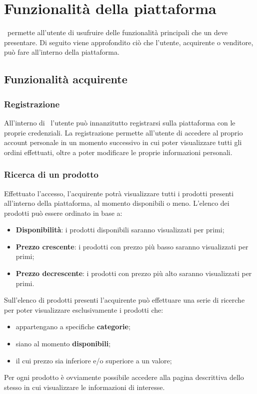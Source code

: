 \section{Funzionalità della piattaforma}
\NomeProgetto\ permette all'utente di usufruire delle funzionalità principali che un  deve presentare. Di seguito viene approfondito ciò che l'utente, acquirente o venditore, può fare all'interno della piattaforma.
\subsection{Funzionalità acquirente}\label{FunzionalitàAcq}
\subsubsection*{Registrazione}
All'interno di \NomeProgetto\ l'utente può innanzitutto registrarsi sulla piattaforma con le proprie credenziali. La registrazione permette all'utente di accedere al proprio account personale in un momento successivo in cui poter visualizzare tutti gli ordini effettuati, oltre a poter modificare le proprie informazioni personali. 
\subsubsection*{Ricerca di un prodotto}
Effettuato l'accesso, l'acquirente potrà visualizzare tutti i prodotti presenti all'interno della piattaforma, al momento disponibili o meno. L'elenco dei prodotti può essere ordinato in base a:
\begin{itemize}
	\item \textbf{Disponibilità}: i prodotti disponibili saranno visualizzati per primi;
	\item \textbf{Prezzo crescente}: i prodotti con prezzo più basso saranno visualizzati per primi;
	\item \textbf{Prezzo decrescente}: i prodotti con prezzo più alto saranno visualizzati per primi.
\end{itemize}
Sull'elenco di prodotti presenti l'acquirente può effettuare una serie di ricerche per poter visualizzare esclusivamente i prodotti che:
\begin{itemize}
	\item appartengano a specifiche \textbf{categorie};
	\item siano al momento \textbf{disponibili};
	\item il cui prezzo sia inferiore e/o superiore a un valore;
\end{itemize}
Per ogni prodotto è ovviamente possibile accedere alla pagina descrittiva dello stesso in cui visualizzare le informazioni di interesse.
